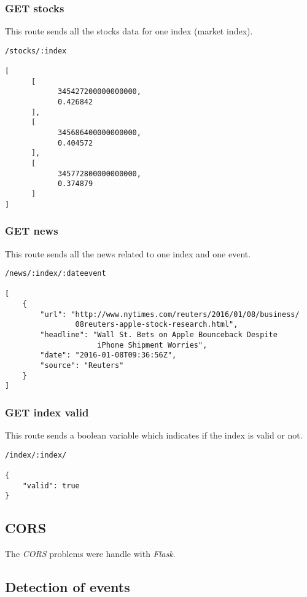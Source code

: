 \subsubsection*{GET stocks}
This route sends all the stocks data for one index (market index).
\begin{verbatim}
/stocks/:index

[
      [
            345427200000000000,
            0.426842
      ],
      [
            345686400000000000,
            0.404572
      ],
      [
            345772800000000000,
            0.374879
      ]
]
\end{verbatim}

\subsubsection*{GET news}
This route sends all the news related to one index and one event.
\begin{verbatim}
/news/:index/:dateevent

[
    {
        "url": "http://www.nytimes.com/reuters/2016/01/08/business/
                08reuters-apple-stock-research.html",
        "headline": "Wall St. Bets on Apple Bounceback Despite
                     iPhone Shipment Worries",
        "date": "2016-01-08T09:36:56Z",
        "source": "Reuters"
    }
]
\end{verbatim}

\subsubsection*{GET index valid}
This route sends a boolean variable which indicates if the index is valid or not.
\begin{verbatim}
/index/:index/

{
    "valid": true
}
\end{verbatim}
\subsection{CORS}

The \textit{CORS} problems were handle with \textit{Flask}.

\subsection{Detection of events}

